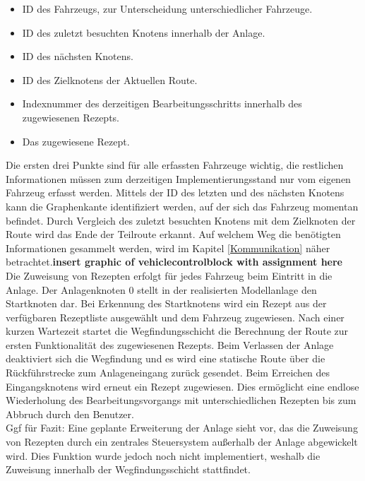 			\begin{itemize}
				\item ID des Fahrzeugs, zur Unterscheidung unterschiedlicher Fahrzeuge.
				\item ID des zuletzt besuchten Knotens innerhalb der Anlage.
				\item ID des nächsten Knotens. 
				\item ID des Zielknotens der Aktuellen Route.
				\item Indexnummer des derzeitigen Bearbeitungsschritts innerhalb des zugewiesenen Rezepts.
				\item Das zugewiesene Rezept.
			\end{itemize} 
			
			Die ersten drei Punkte sind für alle erfassten Fahrzeuge wichtig, die restlichen Informationen müssen zum derzeitigen Implementierungsstand nur vom eigenen Fahrzeug erfasst werden. Mittels der ID des letzten und des nächsten Knotens kann die Graphenkante identifiziert werden, auf der sich das Fahrzeug momentan befindet. Durch Vergleich des zuletzt besuchten Knotens mit dem Zielknoten der Route wird das Ende der Teilroute erkannt. Auf welchem Weg die benötigten Informationen gesammelt werden, wird im  Kapitel \ref{Kommunikation} näher betrachtet.\textbf{insert graphic of vehiclecontrolblock with assignment here}\\
			
			Die Zuweisung von Rezepten erfolgt für jedes Fahrzeug beim Eintritt in die Anlage. Der Anlagenknoten 0 stellt in der realisierten Modellanlage den Startknoten dar. Bei Erkennung des Startknotens wird ein Rezept aus der verfügbaren Rezeptliste ausgewählt und dem Fahrzeug zugewiesen. Nach einer kurzen Wartezeit startet die Wegfindungsschicht die Berechnung der Route zur ersten Funktionalität des zugewiesenen Rezepts. Beim Verlassen der Anlage deaktiviert sich die Wegfindung und es wird eine statische Route über die Rückführstrecke zum Anlageneingang zurück gesendet. Beim Erreichen des Eingangsknotens wird erneut ein Rezept zugewiesen. Dies ermöglicht eine endlose Wiederholung des Bearbeitungsvorgangs  mit unterschiedlichen Rezepten bis zum Abbruch durch den Benutzer.\\
			
			Ggf für Fazit: Eine geplante Erweiterung der Anlage sieht vor, das die Zuweisung von Rezepten durch ein zentrales Steuersystem außerhalb der Anlage abgewickelt wird. Dies Funktion wurde jedoch noch nicht implementiert, weshalb die Zuweisung innerhalb der Wegfindungsschicht stattfindet.
			
